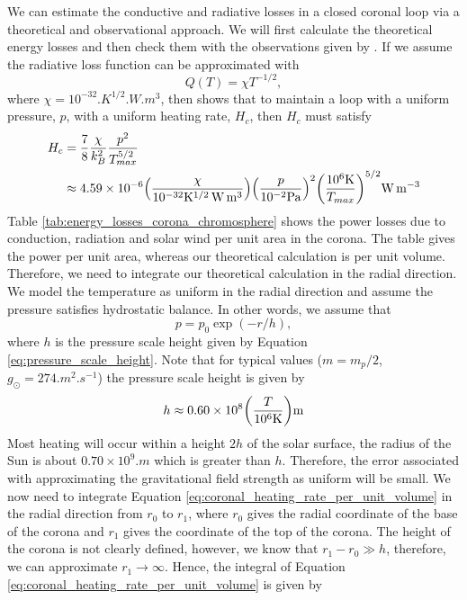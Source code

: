 We can estimate the conductive and radiative losses in a closed coronal loop via a theoretical and observational approach. We will first calculate the theoretical energy losses and then check them with the observations given by \citet{Withbroe1977}. If we assume the radiative loss function can be approximated with
\begin{equation}
    Q(T) = \chi T^{-1/2},
\end{equation}
where $\chi=10^{-32}\si{.K^{1/2}.W.m^3}$, then \citet{Priest2014} shows that to maintain a loop with a uniform pressure, $p$, with a uniform heating rate, $H_c$, then $H_c$ must satisfy
\begin{equation}
    \label{eq:coronal_heating_rate_per_unit_volume}
    \begin{aligned}
    H_c &= \frac{7}{8}\frac{\chi}{k_B^2}\frac{p^2}{T_{max}^{5/2}} \\
    &\approx 4.59\times10^{-6}\qty(\frac{\chi}{10^{-32}\si{.K^{1/2}.W.m^3}})\qty(\frac{p}{10^{-2}\si{.Pa}})^2\qty(\frac{10^6\si{.K}}{T_{max}})^{5/2}\si{.W.m^{-3}}
    \end{aligned}
\end{equation}
Table \ref{tab:energy_losses_corona_chromosphere} shows the power losses due to conduction, radiation and solar wind per unit area in the corona. The table gives the power per unit area, whereas our theoretical calculation is per unit volume. Therefore, we need to integrate our theoretical calculation in the radial direction. We model the temperature as uniform in the radial direction and assume the pressure satisfies hydrostatic balance. In other words, we assume that
\begin{equation}
    p=p_0\exp(-r/h),
\end{equation}
where $h$ is the pressure scale height given by Equation \eqref{eq:pressure_scale_height}. Note that for typical values ($m=m_p/2$, $g_{\odot}=274\si{.m^2.s^{-1}}$) the pressure scale height is given by
\begin{equation}
    h \approx 0.60\times10^8\qty(\frac{T}{10^6\si{.K}})\si{.m}
\end{equation}
Most heating will occur within a height $2h$ of the solar surface, the radius of the Sun is about $0.70\times10^9\si{.m}$ \citep{sun_vital_statistics} which is greater than $h$. Therefore, the error associated with approximating the gravitational field strength as uniform will be small. 
We now need to integrate Equation \eqref{eq:coronal_heating_rate_per_unit_volume} in the radial direction from $r_0$ to $r_1$, where $r_0$ gives the radial coordinate of the base of the corona and $r_1$ gives the coordinate of the top of the corona. The height of the corona is not clearly defined, however, we know that $r_1-r_0\gg h$, therefore, we can approximate $r_1\rightarrow \infty$. Hence, the integral of Equation \eqref{eq:coronal_heating_rate_per_unit_volume} is given by
